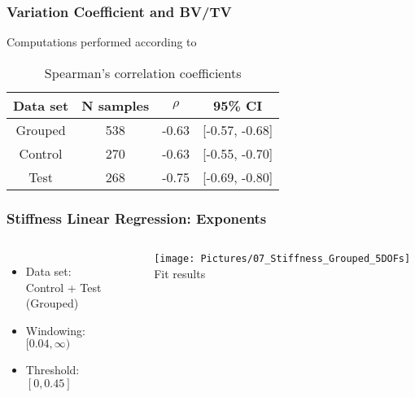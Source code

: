 \documentclass[xcolor=table]{beamer}
\begin{document}

\begin{frame}
	\frametitle{Variation Coefficient and BV/TV}
	Computations performed according to \cite{p2}
	\begin{table}[h!]
	\centering
	\caption{Spearman's correlation coefficients}\label{}
		\begin{tabular}{cccc}
			\toprule
			Data set & N samples & $\rho$ & 95\% CI \\
			\midrule
			Grouped & 538 & -0.63 & [-0.57, -0.68] \\
			Control & 270 & -0.63 & [-0.55, -0.70] \\
			Test & 268 & -0.75 & [-0.69, -0.80] \\
			\bottomrule
		\end{tabular}
	\end{table}
\end{frame}


\begin{frame}
	\frametitle{Stiffness Linear Regression: Exponents}
	\begin{columns}[c]
		\begin{itemize}[label=$\bullet$]
			\item Data set:\\
			Control + Test (Grouped)
			\item Windowing:\\
			$[0.04,\infty)$
			\item Threshold:\\
			$[0,0.45]$
		\end{itemize}
		\centering
		\vfill
		\texttt{[image: Pictures/07\_Stiffness\_Grouped\_5DOFs]}
		Fit results
		\vfill
	\end{columns}
\end{frame}

\end{document}
